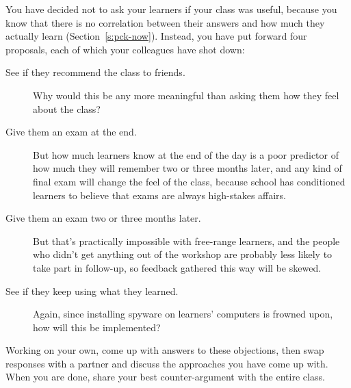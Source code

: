 You have decided not to ask your learners if your class was useful,
because you know that there is no correlation between their answers and
how much they actually learn (Section~\ref{s:pck-now}). Instead, you have
put forward four proposals, each of which your colleagues have shot
down:

\begin{description}
\item[See if they recommend the class to friends.]
Why would this be any more meaningful than asking them how they feel
about the class?
\item[Give them an exam at the end.]
But how much learners know at the end of the day is a poor predictor
of how much they will remember two or three months later, and any
kind of final exam will change the feel of the class, because school
has conditioned learners to believe that exams are always
high-stakes affairs.
\item[Give them an exam two or three months later.]
But that's practically impossible with free-range learners, and the
people who didn't get anything out of the workshop are probably less
likely to take part in follow-up, so feedback gathered this way will
be skewed.
\item[See if they keep using what they learned.]
Again, since installing spyware on learners' computers is frowned
upon, how will this be implemented?
\end{description}

Working on your own, come up with answers to these objections, then swap
responses with a partner and discuss the approaches you have come up
with. When you are done, share your best counter-argument with the
entire class.
